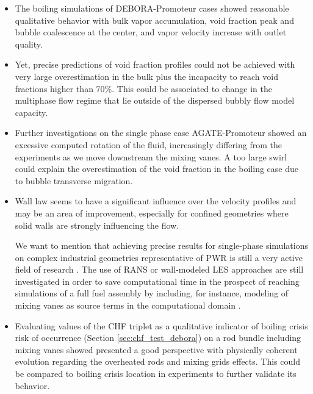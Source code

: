 \begin{itemize}
\item The boiling simulations of DEBORA-Promoteur cases showed reasonable qualitative behavior with bulk vapor accumulation, void fraction peak and bubble coalescence at the center, and vapor velocity increase with outlet quality.

\item Yet, precise predictions of void fraction profiles could not be achieved with very large overestimation in the bulk plus the incapacity to reach void fractions higher than 70\%. This could be associated to change in the multiphase flow regime that lie outside of the dispersed bubbly flow model capacity.

\item Further investigations on the single phase case AGATE-Promoteur showed an excessive computed rotation of the fluid, increasingly differing from the experiments as we move downstream the mixing vanes. A too large swirl could explain the overestimation of the void fraction in the boiling case due to bubble transverse migration.

\item Wall law seems to have a significant influence over the velocity profiles and may be an area of improvement, especially for confined geometries where solid walls are strongly influencing the flow.

\begin{remark*}{}
We want to mention that achieving precise results for single-phase simulations on complex industrial geometries representative of PWR is still a very active field of research \cite{lee_synthesis_2014}. The use of RANS \cite{benhamadouche_use_2017} or wall-modeled LES \cite{gauffre_wall-modeled_2020} approaches are still investigated in order to save computational time in the prospect of reaching simulations of a full fuel assembly by including, for instance, modeling of mixing vanes as source terms in the computational domain \cite{capone_source_2016}.
\end{remark*}

\item Evaluating values of the CHF triplet as a qualitative indicator of boiling crisis risk of occurrence (Section \ref{sec:chf_test_debora}) on a rod bundle including mixing vanes showed presented a good perspective with physically coherent evolution regarding the overheated rods and mixing grids effects. This could be compared to boiling crisis location in experiments to further validate its behavior.
\end{itemize}


